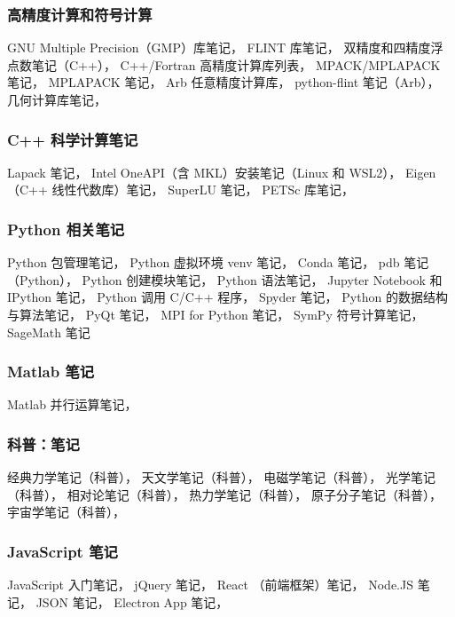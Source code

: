 \subsubsection{高精度计算和符号计算}
GNU Multiple Precision（GMP）库笔记，
FLINT 库笔记，
双精度和四精度浮点数笔记（C++），
C++/Fortran 高精度计算库列表，
MPACK/MPLAPACK 笔记，
MPLAPACK 笔记，
Arb 任意精度计算库，
python-flint 笔记（Arb），
几何计算库笔记，


\subsubsection{C++ 科学计算笔记}
Lapack 笔记，
Intel OneAPI（含 MKL）安装笔记（Linux 和 WSL2），
Eigen （C++ 线性代数库）笔记，
SuperLU 笔记，
PETSc 库笔记，

\subsubsection{Python 相关笔记}
Python 包管理笔记，
Python 虚拟环境 venv 笔记，
Conda 笔记，
pdb 笔记（Python），
Python 创建模块笔记，
Python 语法笔记，
Jupyter Notebook 和 IPython 笔记，
Python 调用 C/C++ 程序，
Spyder 笔记，
Python 的数据结构与算法笔记，
PyQt 笔记，
MPI for Python 笔记，
SymPy 符号计算笔记，
SageMath 笔记

\subsubsection{Matlab 笔记}
Matlab 并行运算笔记，

\subsubsection{科普：笔记}
经典力学笔记（科普），
天文学笔记（科普），
电磁学笔记（科普），
光学笔记（科普），
相对论笔记（科普），
热力学笔记（科普），
原子分子笔记（科普），
宇宙学笔记（科普），

\subsubsection{JavaScript 笔记}
JavaScript 入门笔记，
jQuery 笔记，
React （前端框架）笔记，
Node.JS 笔记，
JSON 笔记，
Electron App 笔记，
